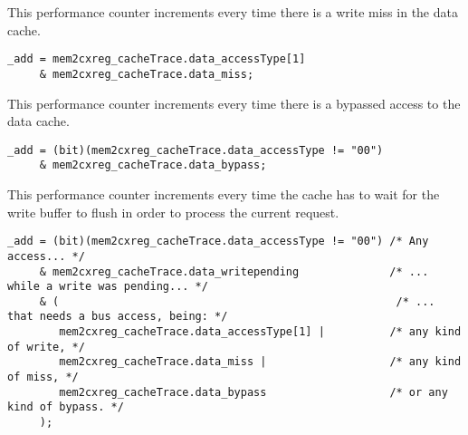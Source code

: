 
This performance counter increments every time there is a write miss in the data 
cache.

\implementation{}
\begin{lstlisting}
_add = mem2cxreg_cacheTrace.data_accessType[1]
     & mem2cxreg_cacheTrace.data_miss;
\end{lstlisting}


This performance counter increments every time there is a bypassed access to the 
data cache.

\implementation{}
\begin{lstlisting}
_add = (bit)(mem2cxreg_cacheTrace.data_accessType != "00")
     & mem2cxreg_cacheTrace.data_bypass;
\end{lstlisting}


This performance counter increments every time the cache has to wait for the
write buffer to flush in order to process the current request.

\implementation{}
\begin{lstlisting}
_add = (bit)(mem2cxreg_cacheTrace.data_accessType != "00") /* Any access... */
     & mem2cxreg_cacheTrace.data_writepending              /* ... while a write was pending... */
     & (                                                    /* ... that needs a bus access, being: */
        mem2cxreg_cacheTrace.data_accessType[1] |          /* any kind of write, */
        mem2cxreg_cacheTrace.data_miss |                   /* any kind of miss, */
        mem2cxreg_cacheTrace.data_bypass                   /* or any kind of bypass. */
     );
\end{lstlisting}
